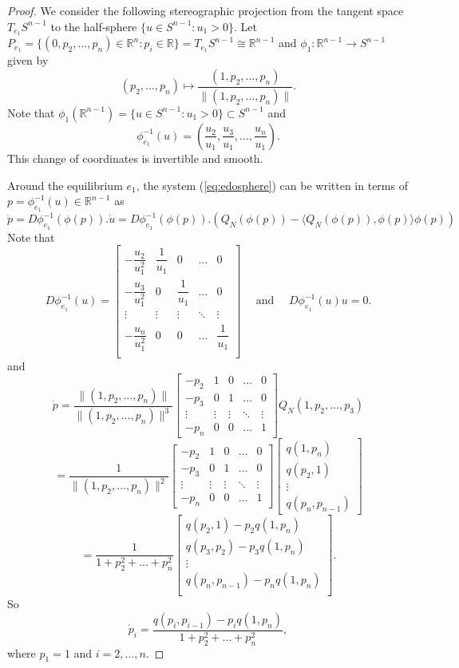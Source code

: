 \documentclass{article}
\theoremstyle{definition}
\begin{document}
\begin{proof}

We consider the following stereographic projection from the tangent space $T_{e_1}S^{n-1}$ to the half-sphere $\{u\in S^{n-1}:u_1>0 \}$.
Let $P_{e_1}=\{(0,p_2,\dots,p_n)\in \mathbb{R}^n:p_i\in\mathbb{R}\}=T_{e_1}S^{n-1}\cong \mathbb{R}^{n-1}$ and $\phi_{1}:\mathbb{R}^{n-1}\rightarrow S^{n-1}$ given by
$$ (p_2,\dots,p_n)\mapsto \dfrac{(1,p_2,\dots,p_n)}{\|(1,p_2,\dots,p_n)\|}.$$
Note that $\phi_{1}(\mathbb{R}^{n-1})=\{u\in S^{n-1}:u_1>0 \}\subset S^{n-1}$ and 
$$\phi^{-1}_{e_1}(u)=(\dfrac{u_2}{u_1},\dfrac{u_3}{u_1},\dots, \dfrac{u_n}{u_1}).$$
This change of coordinates is invertible and smooth.

Around the equilibrium $e_1$, the system (\ref{eq:edosphere}) can be written in terms of $p=\phi^{-1}_{e_1}(u)\in \mathbb{R}^{n-1}$ as
$$\dot{p}=  D \phi^{-1}_{e_1}(\phi(p)).\dot{u}=D \phi^{-1}_{e_1}(\phi(p)).(Q_N(\phi(p))-\langle Q_N(\phi(p)),\phi(p)\rangle \phi(p))$$
Note that 
$$D \phi^{-1}_{e_1}(u)=\begin{bmatrix}
-\dfrac{u_2}{u_1^2}& \dfrac{1}{u_1}&0&\dots &0\\
-\dfrac{u_3}{u_1^2}& 0&\dfrac{1}{u_1}&\dots &0\\
\vdots& \vdots& \vdots& \ddots& \vdots\\
-\dfrac{u_n}{u_1^2}& 0&0&\dots &\dfrac{1}{u_1}\\
\end{bmatrix}\quad \textrm{ and }\quad D\phi^{-1}_{e_1}(u) u=0.$$
and 
$$\dot{p}= \dfrac{\|(1,p_2,\dots, p_n)\|}{\|(1,p_2,\dots, p_n)\|^3}\begin{bmatrix}
-p_2& 1 &0&\dots &0\\
-p_3& 0&1&\dots &0\\
\vdots& \vdots& \vdots& \ddots& \vdots\\
-p_n & 0&0&\dots &1
\end{bmatrix}Q_N(1,p_2,\dots,p_3)$$
$$=
\dfrac{1}{\|(1,p_2,\dots, p_n)\|^2}\begin{bmatrix}
-p_2& 1 &0&\dots &0\\
-p_3& 0&1&\dots &0\\
\vdots& \vdots& \vdots& \ddots& \vdots\\
-p_n & 0&0&\dots &1
\end{bmatrix}\begin{bmatrix}
q(1,p_n)\\
q(p_2,1)\\
\vdots\\
q(p_n,p_{n-1})
\end{bmatrix}
$$
$$
=\dfrac{1}{1+p_2^2+\dots +p_n^2}\begin{bmatrix}
q(p_2,1)-p_2q(1,p_n)\\
q(p_3,p_2)-p_3q(1,p_n)\\
\vdots\\
q(p_n,p_{n-1})-p_n q(1,p_n)\\
\end{bmatrix}.$$
So $$\dot{p}_i=\dfrac{q(p_i,p_{i-1})-p_i q(1,p_n)}{1+p_2^2+\dots +p_n^2},$$
where $p_1=1$ and $i=2,\dots,n$.


\end{proof}
\end{document}
